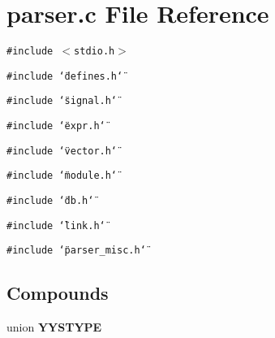 \section{parser.c File Reference}
\label{parser_8c}
{\tt \#include $<$stdio.h$>$}\par
{\tt \#include \char`\"{}defines.h\char`\"{}}\par
{\tt \#include \char`\"{}signal.h\char`\"{}}\par
{\tt \#include \char`\"{}expr.h\char`\"{}}\par
{\tt \#include \char`\"{}vector.h\char`\"{}}\par
{\tt \#include \char`\"{}module.h\char`\"{}}\par
{\tt \#include \char`\"{}db.h\char`\"{}}\par
{\tt \#include \char`\"{}link.h\char`\"{}}\par
{\tt \#include \char`\"{}parser\_\-misc.h\char`\"{}}\par
\subsection*{Compounds}
\begin{CompactItemize}
\item 
union {\bf YYSTYPE}
\end{CompactItemize}

